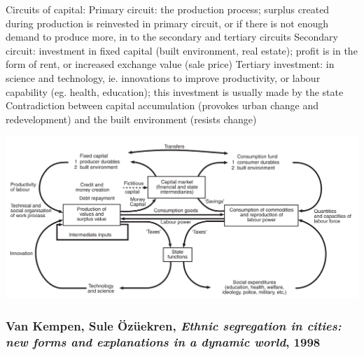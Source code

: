 \documentclass{article}
\begin{document}
\begin{outline}
		\2 Circuits of capital:
			\3 Primary circuit: the production process; surplus created during production is reinvested in primary circuit, or if there is not enough demand to produce more, in to the secondary and tertiary circuits
			\3 Secondary circuit: investment in fixed capital (built environment, real estate); profit is in the form of rent, or increased exchange value (sale price) 
			\3 Tertiary investment: in science and technology, ie. innovations to improve productivity, or labour capability (eg. health, education); this investment is usually made by the state
		\2 Contradiction between capital accumulation (provokes urban change and redevelopment) and the built environment (resists change)
\end{outline}

\includegraphics[width=\textwidth]{harvey_circulation_capital}

\subsubsection{Van Kempen, Sule Özüekren, \textit{Ethnic segregation in cities: new forms and explanations in a dynamic world}, 1998}
\end{document}
